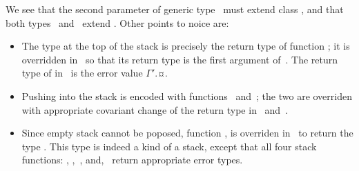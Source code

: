 We see that the second parameter of generic type~ must extend class ,
  and that both types~ and~ extend .
Other points to noice are:
\begin{itemize}
  \item The type at the top of the stack is precisely the return type of function ;
        it is overridden in~ so that its return type is the first argument of~.
        The return type of  in~ is the error value {$Γ'$.¤}.
  \item Pushing into the stack is encoded with functions~ and~;
        the two are overriden with appropriate covariant change of the return type in~ and~.
  \item Since empty stack cannot be poposed, function , is overriden in~ to return
        the type . This type is indeed a kind of a stack, except that all four stack  
        functions: , ,~, and,~ return appropriate error types.
\end{itemize}
